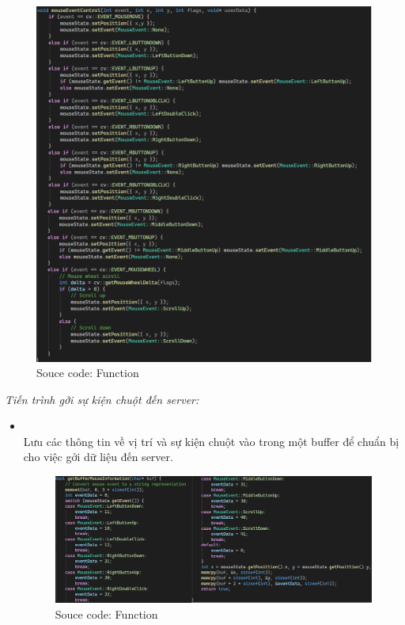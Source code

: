 \begin{itemize}
\begin{itemize}
		\begin{figure}[H]
			\begin{center}
				\includegraphics[scale=0.7]{img/mouseControl}
            \caption{Souce code: Function\textbf{}}
			\end{center}
			
		\end{figure}
	\end{itemize}
	\textit{Tiến trình gởi sự kiện chuột đến server:}
	\begin{itemize}
		\item \textbf{}\\
		Lưu các thông tin về vị trí và sự kiện chuột vào trong một buffer để chuẩn bị cho việc gởi dữ liệu đến server.
			\begin{figure}[H]
			\begin{center}
				\includegraphics[scale=0.65]{img/getMouseBuf}
                \caption{Souce code: Function \textbf{}}
			\end{center}
			

\end{figure}
\end{itemize}
\end{itemize}
